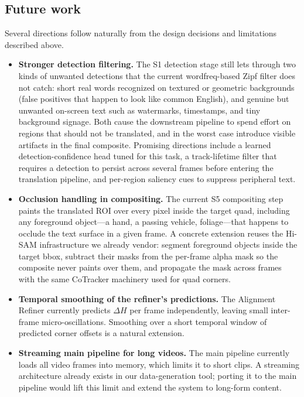 \subsection{Future work}
\label{sec:conclusion:future}

Several directions follow naturally from the design decisions and
limitations described above.

\begin{itemize}[leftmargin=*]
  \item \textbf{Stronger detection filtering.} The S1 detection
    stage still lets through two kinds of unwanted detections that
    the current wordfreq-based Zipf filter does not catch:
    short real words recognized on textured or geometric
    backgrounds (false positives that happen to look like common
    English), and genuine but unwanted on-screen text such as
    watermarks, timestamps, and tiny background signage. Both
    cause the downstream pipeline to spend effort on regions that
    should not be translated, and in the worst case introduce
    visible artifacts in the final composite. Promising directions
    include a learned detection-confidence head tuned for this
    task, a track-lifetime filter that requires a detection to
    persist across several frames before entering the translation
    pipeline, and per-region saliency cues to suppress
    peripheral text.
  \item \textbf{Occlusion handling in compositing.} The current
    S5 compositing step paints the translated ROI over every pixel
    inside the target quad, including any foreground object---a
    hand, a passing vehicle, foliage---that happens to occlude the
    text surface in a given frame. A concrete extension reuses the
    Hi-SAM infrastructure we already vendor: segment foreground
    objects inside the target bbox, subtract their masks from the
    per-frame alpha mask so the composite never paints over them,
    and propagate the mask across frames with the same CoTracker
    machinery used for quad corners.
  \item \textbf{Temporal smoothing of the refiner's predictions.}
    The Alignment Refiner currently predicts $\Delta H$ per frame
    independently, leaving small inter-frame micro-oscillations.
    Smoothing over a short temporal window of predicted corner
    offsets is a natural extension.
  \item \textbf{Streaming main pipeline for long videos.} The main
    pipeline currently loads all video frames into memory, which
    limits it to short clips. A streaming architecture already
    exists in our data-generation tool; porting it to the main
    pipeline would lift this limit and extend the system to
    long-form content.
\end{itemize}
